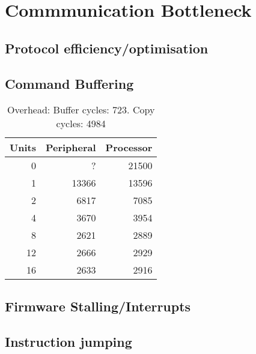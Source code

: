 \documentclass[a4paper,9pt]{report}
\begin{document}
\section{Commmunication Bottleneck}
\subsection{Protocol efficiency/optimisation}



\subsection{Command Buffering}

\begin{table}
  \centering
  \begin{tabular}{r|rr}
    \toprule
    Units & Peripheral & Processor\\
    \midrule
    0  &     ? & 21500 \\
    1  & 13366 & 13596 \\
    2  &  6817 &  7085 \\
    4  &  3670 &  3954 \\
    8  &  2621 &  2889 \\
    12 &  2666 &  2929 \\
    16 &  2633 &  2916 \\
    \bottomrule
  \end{tabular}
  \caption{Overhead: Buffer cycles: 723. Copy cycles: 4984}
\end{table}


\subsection{Firmware Stalling/Interrupts}

\subsection{Instruction jumping}
\end{document}
